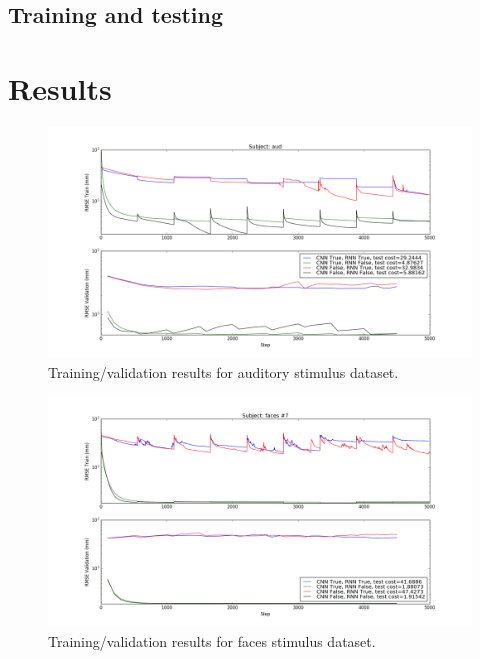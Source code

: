 \documentclass[journal]{IEEEtran}
\begin{document}
\subsection{Training and testing}
\section{Results}

\begin{figure}[!t]
\centering
\includegraphics[width=7in]{aud}
\caption{Training/validation results for auditory stimulus dataset.}
\label{fig_aud}
\end{figure}

\begin{figure}[!t]
\centering
\includegraphics[width=7in]{faces}
\caption{Training/validation results for faces stimulus dataset.}
\label{fig_faces}
\end{figure}
\end{document}
